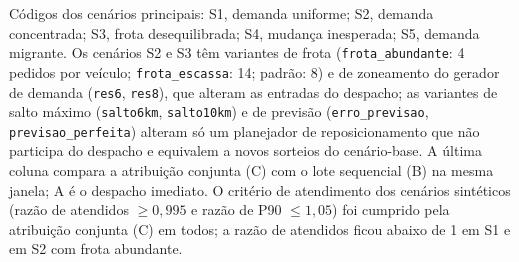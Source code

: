 Códigos dos cenários principais: S1, demanda uniforme; S2, demanda concentrada; S3, frota desequilibrada; S4, mudança inesperada; S5, demanda migrante. Os cenários S2 e S3 têm variantes de frota (\texttt{frota\_abundante}: 4 pedidos por veículo; \texttt{frota\_escassa}: 14; padrão: 8) e de zoneamento do gerador de demanda (\texttt{res6}, \texttt{res8}), que alteram as entradas do despacho; as variantes de salto máximo (\texttt{salto6km}, \texttt{salto10km}) e de previsão (\texttt{erro\_previsao}, \texttt{previsao\_perfeita}) alteram só um planejador de reposicionamento que não participa do despacho e equivalem a novos sorteios do cenário-base. A última coluna compara a atribuição conjunta (C) com o lote sequencial (B) na mesma janela; A é o despacho imediato. O critério de atendimento dos cenários sintéticos (razão de atendidos $\ge 0{,}995$ e razão de P90 $\le 1{,}05$) foi cumprido pela atribuição conjunta (C) em todos; a razão de atendidos ficou abaixo de 1 em S1 e em S2 com frota abundante.

